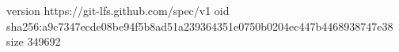 version https://git-lfs.github.com/spec/v1
oid sha256:a9c7347ecde08be94f5b8ad51a239364351e0750b0204ec447b4468938747e38
size 349692
